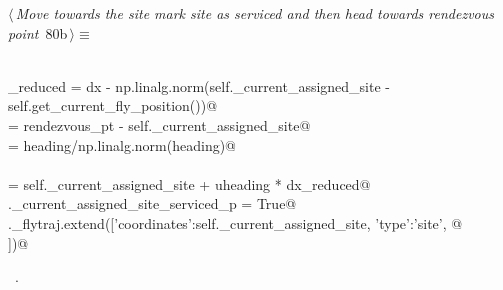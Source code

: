 \documentclass[11.5pt]{report}
\begin{document}
\vspace{-0.8cm} \newchunk {}
\begin{flushleft} \small
\begin{minipage}{\linewidth}\label{scrap124}\raggedright\small
{} $\langle\,${\itshape Move towards the site mark site as serviced and then head towards rendezvous point}\nobreak\ {\footnotesize {80b}}$\,\rangle\equiv$
\vspace{-1ex}
\begin{list}{}{} \item
\mbox{}\verb@@\\
\mbox{}\verb@dx_reduced = dx - np.linalg.norm(self._current_assigned_site -\@\\
\mbox{}\verb@                                 self.get_current_fly_position())@\\
\mbox{}\verb@heading  = rendezvous_pt - self._current_assigned_site@\\
\mbox{}\verb@uheading = heading/np.linalg.norm(heading)@\\
\mbox{}\verb@@\\
\mbox{}\verb@newpt = self._current_assigned_site + uheading * dx_reduced@\\
\mbox{}\verb@self._current_assigned_site_serviced_p = True@\\
\mbox{}\verb@self._flytraj.extend([{'coordinates':self._current_assigned_site, 'type':'site'}, @\\
\mbox{}])@\\
\mbox{}\verb@@{\NWsep}
\end{list}
\vspace{-1.5ex}
\footnotesize
\begin{list}{}{\setlength{\itemsep}{-\parsep}\setlength{\itemindent}{-\leftmargin}}
\item \NWtxtMacroRefIn\ .

\item{}
\end{list}
\end{minipage}\vspace{4ex}
\end{flushleft}
\end{document}
